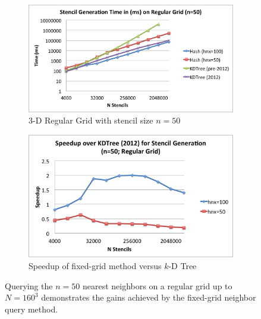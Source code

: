 \documentclass{report}
\begin{document}
\begin{figure}
\centering
\begin{subfigure}{11cm}
\centering
\includegraphics[width=\textwidth]{../figures/stencils/kdtree_old_reg_subsets_4m_stencil_gen_time.png}
\caption{3-D Regular Grid with stencil size $n=50$}
\end{subfigure}
\begin{subfigure}{9.5cm}
\centering
\includegraphics[width=\textwidth]{../figures/stencils/reg_subsets_4m_stencil_gen_speedup.png}
\caption{Speedup of fixed-grid method versus $k$-D Tree}
\end{subfigure}
\caption{Querying the $n=50$ nearest neighbors on a regular grid up to $N=160^3$ demonstrates the gains achieved by the fixed-grid neighbor query method.}
\label{fig:stencil_query_old_and_new}
\end{figure}
\end{document}
